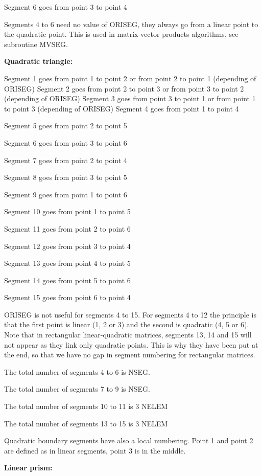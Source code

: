 Segment 6 goes from point 3 to point 4

Segments 4 to 6 need no value of ORISEG, they always go from a linear point to
the quadratic point. This is used in matrix-vector products algorithms, see
subroutine MVSEG.

\textbf{Quadratic triangle:}

Segment 1 goes from point 1 to point 2 or from point 2 to point 1 (depending of ORISEG)
Segment 2 goes from point 2 to point 3 or from point 3 to point 2 (depending of ORISEG)
Segment 3 goes from point 3 to point 1 or from point 1 to point 3 (depending of ORISEG)
Segment 4 goes from point 1 to point 4

Segment 5 goes from point 2 to point 5

Segment 6 goes from point 3 to point 6

Segment 7 goes from point 2 to point 4

Segment 8 goes from point 3 to point 5

Segment 9 goes from point 1 to point 6

Segment 10 goes from point 1 to point 5

Segment 11 goes from point 2 to point 6

Segment 12 goes from point 3 to point 4

Segment 13 goes from point 4 to point 5

Segment 14 goes from point 5 to point 6

Segment 15 goes from point 6 to point 4

ORISEG is not useful for segments 4 to 15. For segments 4 to 12 the principle
is that the first point is linear (1, 2 or 3) and the second is quadratic (4, 5
or 6). Note that in rectangular linear-quadratic matrices, segments 13, 14 and
15 will not appear as they link only quadratic points. This is why they have
been put at the end, so that we have no gap in segment numbering for
rectangular matrices.

The total number of segments 4 to 6 is NSEG.

The total number of segments 7 to 9 is NSEG.

The total number of segments 10 to 11 is 3 NELEM

The total number of segments 13 to 15 is 3 NELEM

Quadratic boundary segments have also a local numbering. Point 1 and point 2
are defined as in linear segments, point 3 is in the middle.

\textbf{Linear prism:}

